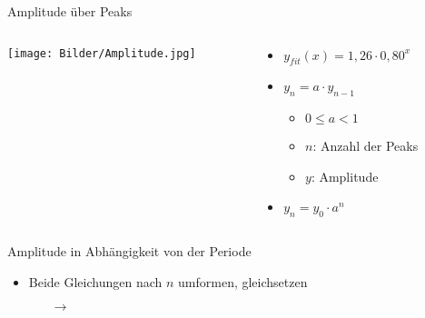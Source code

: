 \documentclass[12pt]{beamer}
\begin{document}
\begin{frame}{Amplitude über Peaks}
\begin{columns}
\begin{column}{.55\textwidth}
	\texttt{[image: Bilder/Amplitude.jpg]}
\end{column}
\begin{column}{.45\textwidth}
	\begin{itemize}
	\item<1-> $y_{fit}(x)=1,26\cdot 0,80^x$
	\item<2-> $y_n=a\cdot y_{n-1}$
		\begin{itemize}
		\item $0\leq a<1$
		\item $n$: Anzahl der Peaks
		\item $y$: Amplitude
		\end{itemize}
	\item<3->[$\Rightarrow$] $y_n=y_0\cdot a^n$
	\end{itemize}
\end{column}
\end{columns}
	
\end{frame}

\begin{frame}{Amplitude in Abhängigkeit von der Periode}
\begin{itemize}
\item Beide Gleichungen nach $n$ umformen, gleichsetzen 
	\begin{itemize}
	\item[$\rightarrow$]
	\end{itemize}
\end{itemize}
\end{frame}
\end{document}
